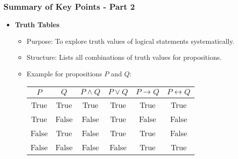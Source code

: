 \documentclass[aspectratio=169]{beamer}
\begin{document}
\begin{frame}[fragile]
  \frametitle{Summary of Key Points - Part 2}
  \begin{itemize}
      \item \textbf{Truth Tables}
      \begin{itemize}
          \item Purpose: To explore truth values of logical statements systematically.
          \item Structure: Lists all combinations of truth values for propositions.
          \item Example for propositions \(P\) and \(Q\):

          \begin{center}
          \begin{tabular}{|c|c|c|c|c|c|}
          \hline
          \(P\) & \(Q\) & \(P \land Q\) & \(P \lor Q\) & \(P \rightarrow Q\) & \(P \leftrightarrow Q\) \\
          \hline
          True & True & True & True & True & True \\
          True & False & False & True & False & False \\
          False & True & False & True & True & False \\
          False & False & False & False & True & True \\
          \hline
          \end{tabular}
          \end{center}
      \end{itemize}
  \end{itemize}
\end{frame}
\end{document}
